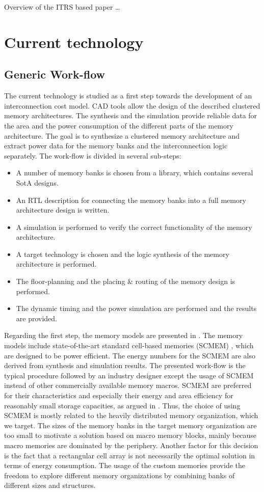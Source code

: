 Overview of the ITRS based paper \ldots

\section{Current technology}
\label{Current}

\subsection{Generic Work-flow}

The current technology is studied as a first step towards the development of an interconnection cost model. 
CAD tools allow the design of the described clustered memory architectures.
The synthesis and the simulation provide reliable data for the area and the power consumption of the different parts of the memory architecture.
The goal is to synthesize a clustered memory architecture and extract power data for the memory banks and the interconnection logic separately.
The work-flow is divided in several sub-steps:

\begin{itemize}
	\item A number of memory banks is chosen from a library, which contains several SotA designs.
	\item An RTL description for connecting the memory banks into a full memory architecture design is written.
	\item A simulation is performed to verify the correct functionality of the memory architecture.
	\item A target technology is chosen and the logic synthesis of the memory architecture is performed.
	\item The floor-planning and the placing \& routing of the memory design is performed.
	\item The dynamic timing and the power simulation are performed and the results are provided.
\end{itemize}

Regarding the first step, the memory models are presented in \cite{filippopoulos2013exploration}.
The memory models include state-of-the-art standard cell-based memories (SCMEM) \cite{Mei11}, which are designed to be power efficient. 
The energy numbers for the SCMEM are also derived from synthesis and simulation results.
The presented work-flow is the typical procedure followed by an industry designer except the usage of SCMEM instead of other commercially available memory macros.
SCMEM are preferred for their characteristics and especially their energy and area efficiency for reasonably small storage capacities, as argued in \cite{Mei10}. 
Thus, the choice of using SCMEM is mostly related to the heavily distributed memory organization, which we target. 
The sizes of the memory banks in the target memory organization are too small to motivate a solution based on macro memory blocks, mainly because macro memories are dominated by the periphery.
Another factor for this decision is the fact that a rectangular cell array is not necessarily the optimal solution in terms of energy consumption.
The usage of the custom memories provide the freedom to explore different memory organizations by combining banks of different sizes and structures.  

